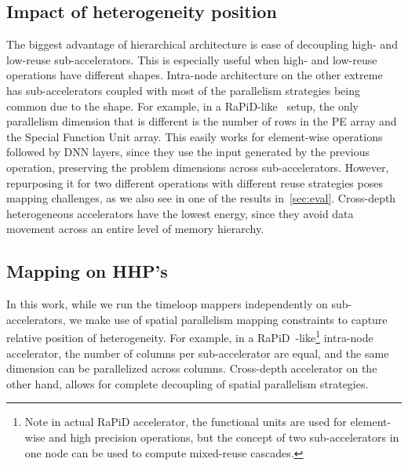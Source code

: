 \subsection{Impact of heterogeneity position}

The biggest advantage of hierarchical architecture is ease of decoupling high- and low-reuse sub-accelerators. This is especially useful when high- and low-reuse operations have different shapes. Intra-node architecture on the other extreme has sub-accelerators coupled with most of the parallelism strategies being common due to the shape. For example, in a RaPiD-like~\cite{rapid} setup, the only parallelism dimension that is different is the number of rows in the PE array and the Special Function Unit array. This easily works for element-wise operations followed by DNN layers, since they use the input generated by the previous operation, preserving the problem dimensions across sub-accelerators. However, repurposing it for two different operations with different reuse strategies poses mapping challenges, as we also see in one of the results in~\autoref{sec:eval}. Cross-depth heterogeneous accelerators have the lowest energy, since they avoid data movement across an entire level of memory hierarchy.




\subsection{Mapping on HHP's}
\label{sec:mapping}

In this work, while we run the timeloop mappers independently on sub-accelerators, we make use of spatial parallelism mapping constraints to capture relative position of heterogeneity. For example, in a RaPiD~\cite{rapid}-like\footnote{Note in actual RaPiD accelerator, the functional units are used for element-wise and high precision operations, but the concept of two sub-accelerators in one node can be used to compute mixed-reuse cascades.} intra-node accelerator, the number of columns per sub-accelerator are equal, and the same dimension can be parallelized across columns. Cross-depth accelerator on the other hand, allows for complete decoupling of spatial parallelism strategies.

